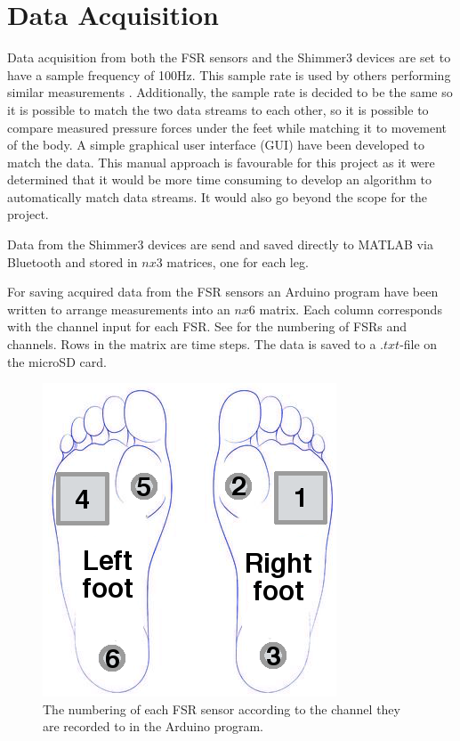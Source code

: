 \section{Data Acquisition}

Data acquisition from both the FSR sensors and the Shimmer3 devices are set to have a sample frequency of 100Hz. This sample rate is used by others performing similar measurements \cite{Verkerke2005, Byun2016, Sherwani2016}. Additionally, the sample rate is decided to be the same so it is possible to match the two data streams to each other, so it is possible to compare measured pressure forces under the feet while matching it to movement of the body. A simple graphical user interface (GUI) have been developed to match the data. This manual approach is favourable for this project as it were determined that it would be more time consuming to develop an algorithm to automatically match data streams. It would also go beyond the scope for the project.

Data from the Shimmer3 devices are send and saved directly to MATLAB via Bluetooth and stored in $nx3$ matrices, one for each leg.

For saving acquired data from the FSR sensors an Arduino program have been written to arrange measurements into an $nx6$ matrix. Each column corresponds with the channel input for each FSR. See  for the numbering of FSRs and channels. Rows in the matrix are time steps. The data is saved to a $.txt$-file on the microSD card. 

\begin{figure}[H]
	\includegraphics[width=.6\textwidth]{figures/FSRNumbering}
	\caption{The numbering of each FSR sensor according to the channel they are recorded to in the Arduino program.}
	\label{fig:FSRNumbering}  %
\end{figure}

